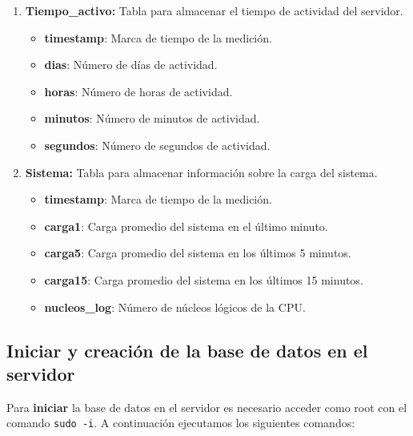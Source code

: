 \documentclass{article}
\begin{document}
\begin{enumerate}
\begin{itemize}
        \item \textbf{mac}: Dirección MAC de la interfaz.
        \item \textbf{broadcast}: Dirección de broadcast de la interfaz.
        \item \textbf{bytes\_enviados}: Número de bytes enviados por la interfaz.
        \item \textbf{bytes\_recibidos}: Número de bytes recibidos por la interfaz.
    \end{itemize}
    \item \textbf{Tiempo\_activo:} Tabla para almacenar el tiempo de actividad del servidor.
    \begin{itemize}
        \item \textbf{timestamp}: Marca de tiempo de la medición.
        \item \textbf{dias}: Número de días de actividad.
        \item \textbf{horas}: Número de horas de actividad.
        \item \textbf{minutos}: Número de minutos de actividad.
        \item \textbf{segundos}: Número de segundos de actividad.
    \end{itemize}
    \item \textbf{Sistema:} Tabla para almacenar información sobre la carga del sistema.
    \begin{itemize}
        \item \textbf{timestamp}: Marca de tiempo de la medición.
        \item \textbf{carga1}: Carga promedio del sistema en el último minuto.
        \item \textbf{carga5}: Carga promedio del sistema en los últimos 5 minutos.
        \item \textbf{carga15}: Carga promedio del sistema en los últimos 15 minutos.
        \item \textbf{nucleos\_log}: Número de núcleos lógicos de la CPU.
    \end{itemize}
\end{enumerate}


\subsection{Iniciar y creación de la base de datos en el servidor}

Para \textbf{iniciar} la base de datos en el servidor es necesario acceder como root con el comando \lstinline{sudo -i}. A continuación ejecutamos los siguientes comandos:
\end{document}
